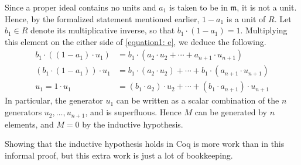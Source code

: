 \documentclass{article}
\begin{document}
Since a proper ideal contains no units and $a_1$ is taken to be in $\mathfrak{m}$, it is not a unit.  
Hence, by the formalized statement mentioned earlier, $1-a_1$ is a unit of $R$.    
Let $b_{1} \in R$ denote its 
multiplicative inverse, so that $b_1 \cdot  (1 - a_{1}) = 1$.
Multiplying this element on the either side of \eqref{equation1: e}, we deduce the following.  
\begin{align*}
b_1 \cdot \left(  (1 - a_{1}) \cdot u_{1} \right)  & = b_1 \cdot  ( a_{2} \cdot u_{2} + \cdots + a_{n+1} \cdot u_{n+1} ) \\
\left( b_1 \cdot  (1 - a_{1})\right) \cdot u_{1}   & = b_1 \cdot  ( a_{2} \cdot u_{2} ) + \cdots + b_1  \cdot   (a_{n+1} \cdot u_{n+1} )  \\
u_1 = 1 \cdot u_{1}   & = ( b_1 \cdot  a_{2}  ) \cdot u_{2}  + \cdots + ( b_1  \cdot  a_{n+1} ) \cdot u_{n+1}  
\end{align*}
In particular, the generator $u_1$ can be written as a scalar combination of the $n$ generators $u_2, \ldots, u_{n+1}$, and is superfluous. Hence $M$ can be generated by $n$ elements, and $M=0$ by the inductive hypothesis. 


Showing that
the inductive hypothesis holds in Coq is more work than in this informal
proof, but this extra work is just a lot of bookkeeping.



\end{document}
